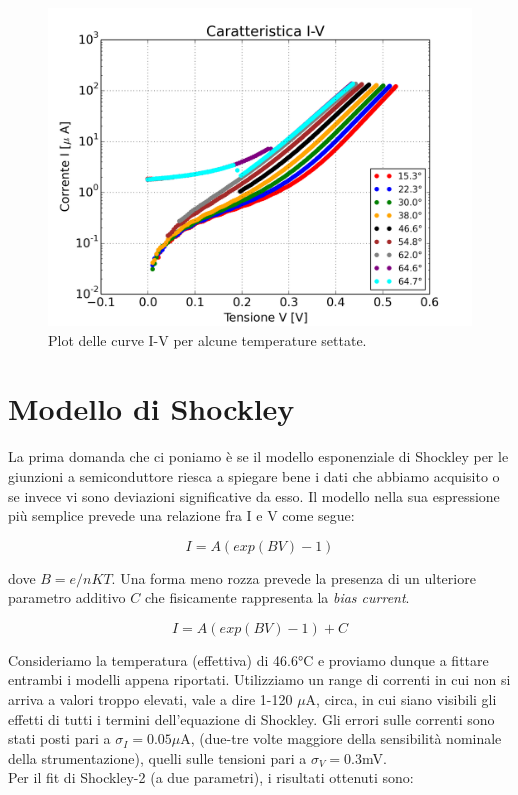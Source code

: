\documentclass[10pt,letterpaper]{article}
\begin{document}
\begin{figure}
\centering
\includegraphics[width=0.7\linewidth]{./tutte_temp}
\caption{Plot delle curve I-V per alcune temperature settate.}
\label{fig:tutte_temp}
\end{figure}
  

\section{Modello di Shockley}
La prima domanda che ci poniamo è se il modello esponenziale di Shockley per le giunzioni a semiconduttore riesca a spiegare bene i dati che abbiamo acquisito o se invece vi sono deviazioni significative da esso. Il modello nella sua espressione più semplice prevede una relazione fra I e V come segue:

\begin{equation}
I = A \left( exp(BV)-1 \right)
\end{equation}

dove $B = e/nKT$. Una forma meno rozza prevede la presenza di un ulteriore parametro additivo $C$ che fisicamente rappresenta la \textit{bias current}.

\begin{equation}
I = A \left( exp(BV)-1 \right) + C
\end{equation}

Consideriamo la temperatura (effettiva) di 46.6°C e proviamo dunque a fittare entrambi i modelli appena riportati. Utilizziamo un range di correnti in cui non si arriva a valori troppo elevati, vale a dire 1-120 $\mu$A, circa, in cui siano visibili gli effetti di tutti i termini dell'equazione di Shockley. Gli errori sulle correnti sono stati posti pari a $\sigma_I = 0.05 \mu$A, (due-tre volte maggiore della sensibilità nominale della strumentazione), quelli sulle tensioni pari a $\sigma_V = 0.3$mV.\\
Per il fit di Shockley-2 (a due parametri), i risultati ottenuti sono:
\end{document}
